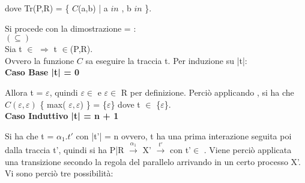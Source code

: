 dove Tr(P,R) = \{ $C$(a,b) | a $in$ , b $in$ \}.

Si procede con la dimostrazione  = :\\

$(\subseteq)$ 
\\

Sia t $\in$  $\Rightarrow$  t $\in$(P,R).\\
Ovvero la funzione $C$ sa eseguire la traccia t.
Per induzione su |t|:\\

\textbf{Caso Base |t| = 0}

Allora t = $\varepsilon$, quindi $\varepsilon \in$  e $\varepsilon \in$ {R} per definizione. Perciò applicando , si ha che $C(\varepsilon, \varepsilon)$ \{ max( $\varepsilon, \varepsilon$)  \} = \{$\varepsilon$\} dove t $\in$ \{$\varepsilon$\}.\\

\textbf{Caso Induttivo |t| = n + 1}

Si ha che t = $\alpha_{1}.t'$ con |t'| = n ovvero, t ha una prima interazione seguita poi dalla traccia t', quindi si ha P|R $ \overset{\alpha_{1}}\rightarrow $ X' $\overset{t'}\rightarrow$ con t'$\in$ . Viene perciò applicata una transizione secondo la regola del parallelo arrivando in un certo processo X'. Vi sono perciò tre possibilità:

